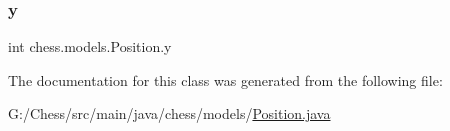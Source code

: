 \mbox{\label{classchess_1_1models_1_1_position_a9f261b4012bcedec786be011dee19fbf}} 
\subsubsection{\texorpdfstring{y}{y}}
{\footnotesize\ttfamily int chess.\+models.\+Position.\+y\hspace{0.3cm}{\ttfamily [private]}}



The documentation for this class was generated from the following file\+:\begin{DoxyCompactItemize}
\item 
G\+:/\+Chess/src/main/java/chess/models/\mbox{\hyperlink{_position_8java}{Position.\+java}}\end{DoxyCompactItemize}
